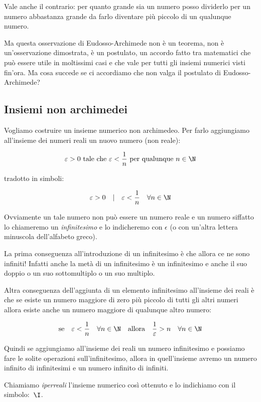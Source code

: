 Vale anche il contrario: per quanto grande sia un numero posso dividerlo per un 
numero abbastanza grande da farlo diventare più piccolo di un qualunque numero.

Ma questa osservazione di Eudosso-Archimede non è un teorema, non è 
un'osservazione dimostrata, è un postulato, un accordo fatto tra matematici che 
può essere utile in moltissimi casi e che vale per tutti gli insiemi numerici 
visti fin'ora. Ma cosa succede se ci accordiamo che non valga il postulato di 
Eudosso-Archimede?

\subsection{Insiemi non archimedei}
\label{subsec:insnum_nonarchimedei}

Vogliamo costruire un insieme numerico non archimedeo. Per farlo aggiungiamo 
all'insieme dei numeri reali un nuovo numero (non reale):

\[\varepsilon > 0 \text{ tale che } 
\varepsilon < \frac{1}{n} \text{ per qualunque } n \in \N\]

tradotto in simboli:

\[\varepsilon > 0 \quad | \quad \varepsilon < \frac{1}{n} \quad \forall n \in 
\N\]

Ovviamente un tale numero non può essere un numero reale e un numero siffatto 
lo chiameremo un \emph{infinitesimo} e lo indicheremo con $\epsilon$ 
(o con un'altra lettera minuscola dell'alfabeto greco).

La prima conseguenza all'introduzione di un infinitesimo è che allora ce ne 
sono infiniti! Infatti anche la metà di un infinitesimo è un infinitesimo e 
anche il suo doppio o un suo sottomultiplo o un suo multiplo.

Altra conseguenza dell'aggiunta di un elemento infinitesimo all'insieme dei 
reali è che se esiste un numero maggiore di zero più piccolo di tutti gli altri 
numeri allora esiste anche un numero maggiore di qualunque altro numero:

\[\text{se} \quad \varepsilon < \frac{1}{n} \quad \forall n \in \N 
\quad \text{allora} \quad \frac{1}{\varepsilon} > n \quad \forall n 
\in \N\]

Quindi se aggiungiamo all'insieme dei reali un numero infinitesimo e possiamo 
fare le solite operazioni sull'infinitesimo, allora in quell'insieme avremo un 
numero infinito di infinitesimi e un numero infinito di infiniti.

Chiamiamo \emph{iperreali} l'insieme numerico così ottenuto e lo indichiamo con 
il simbolo:~$\I$.

